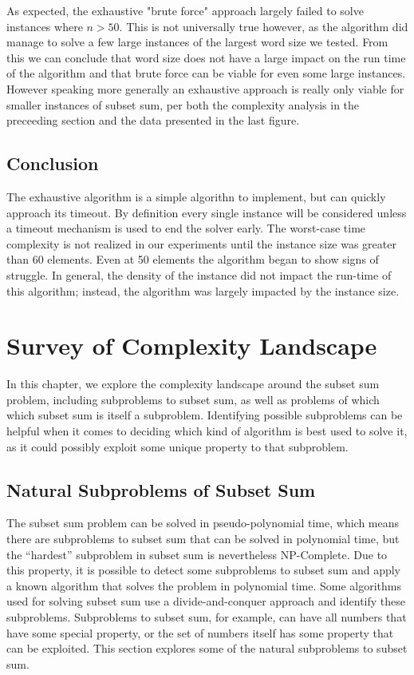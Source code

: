 \documentclass{report}
\begin{document}
As expected, the exhaustive "brute force" approach largely failed to solve
instances where $n > 50$. This is not universally true however, as the algorithm
did manage to solve a few large instances of the largest word size we tested. From 
this we can conclude that word size does not have a large impact on the run time of
the algorithm and that brute force can be viable for even some large instances.
However speaking more generally an exhaustive approach is really only viable for
smaller instances of subset sum, per both the complexity analysis in the preceeding
section and the data presented in the last figure.

\section{Conclusion}
The exhaustive algorithm is a simple algorithn to implement, but can quickly approach
its timeout. By definition every single instance will be considered
unless a timeout mechanism is used to end the solver early.
The worst-case time complexity is not realized in our experiments until the instance
size was greater than 60 elements. Even at 50 elements the algorithm began to show
signs of struggle. In general, the density of the instance did not
impact the run-time of this algorithm; instead, the algorithm was largely impacted by the
instance size.

\chapter{Survey of Complexity Landscape}
In this chapter, we explore the complexity landscape around the subset sum
problem, including subproblems to subset sum, as well as problems of which
which subset sum is itself a subproblem. Identifying possible subproblems can be helpful
when it comes to deciding which kind of algorithm is best used to solve it, as it
could possibly exploit some unique property to that subproblem.

\section{Natural Subproblems of Subset Sum}
The subset sum problem can be solved in pseudo-polynomial time, which means
there are subproblems to subset sum that can be solved in polynomial time,
but the ``hardest'' subproblem in subset sum is nevertheless NP-Complete. Due
to this property, it is possible to detect some subproblems to subset
sum and apply a known algorithm that solves the problem in polynomial time.
Some algorithms used for solving subset sum use a divide-and-conquer
approach and identify these subproblems. Subproblems
to subset sum, for example, can have all numbers that have some special
property, or the set of numbers itself has some property that can be
exploited.
This section explores some of the natural subproblems to subset sum. 
\end{document}
